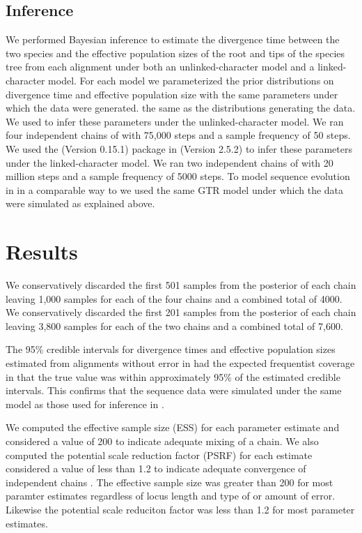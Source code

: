 \subsection{Inference}
We performed Bayesian inference to estimate the divergence time between the two species and the effective 
population sizes of the root and tips of the species tree from each alignment 
under both an unlinked-character model and a linked-character model. For each 
model we parameterized the prior distributions on divergence time and effective
population size with the same parameters under which the data were generated. 
the same as the distributions generating the data.
We used \ecoevolity
\citep[Version 0.3.2; dev branch commit a7e9bf2;][]{Oaks2018ecoevolity}
to infer these parameters under the 
unlinked-character model.
We ran four independent chains of \ecoevolity with 75,000 steps and a sample 
frequency of 50 steps.
We used the \beast (Version 0.15.1) \citep{@ogilvieStarBEAST2BringsFaster2017} 
package in \beastcore (Version 2.5.2) \citep{@bouckaertBEASTSoftwarePlatform2014}
to infer these parameters under the linked-character model. 
We ran two independent chains of \beast with 20 million steps and a 
sample frequency of 5000 steps. 
To model sequence evolution in \beast in a comparable way to \ecoevolity we used 
the same GTR model under which the data were simulated as explained above.


\section{Results}

We conservatively discarded the first 501 samples from the posterior of each 
\ecoevolity chain leaving 1,000 samples for each of the four chains and a combined
total of 4000.
We conservatively discarded the first 201 samples from the posterior of each 
\beast chain leaving 3,800 samples for each of the two chains and a combined
total of 7,600.

The 95\% credible intervals for divergence times and effective population 
sizes estimated from alignments without error in \beast had the expected 
frequentist coverage in that the true value was within approximately 95\% of the 
estimated credible intervals. 
This confirms that the sequence data were simulated under the same model as 
those used for inference in \beast. 

We computed the effective sample size (ESS) for each parameter estimate and considered
a value of 200 to indicate adequate mixing of a chain. 
We also computed the potential scale reduction factor (PSRF) for each estimate 
considered a value of less than 1.2 to indicate adequate convergence of 
independent chains \citep{gelman1998}. 
The effective sample size was greater than 200 for most \ecoevolity paramter
estimates regardless of locus length and type of or amount of error. 
Likewise the potential scale reduciton factor was less than 1.2 for most \ecoevolity parameter estimates.

